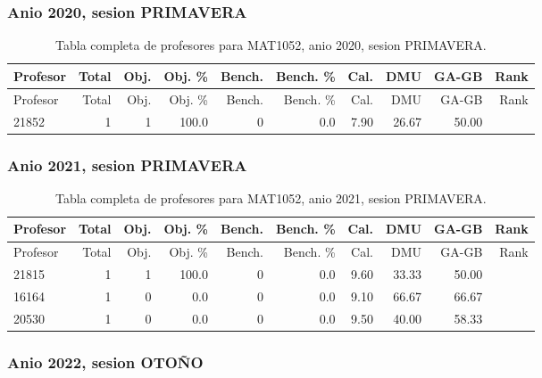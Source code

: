 \subsubsection{Anio 2020, sesion PRIMAVERA}

\begingroup
\scriptsize
\setlength{\tabcolsep}{3pt}
\begin{longtable}{lrrrrrrrrr}
\caption{Tabla completa de profesores para MAT1052, anio 2020, sesion PRIMAVERA.}\label{tab:prof-period-mat1052-2020-primavera}\\
\toprule
Profesor & Total & Obj. & Obj. \% & Bench. & Bench. \% & Cal. & DMU & GA-GB & Rank \\
\midrule
\endfirsthead
\toprule
Profesor & Total & Obj. & Obj. \% & Bench. & Bench. \% & Cal. & DMU & GA-GB & Rank \\
\midrule
\endhead
21852 & 1 & 1 & 100.0 & 0 & 0.0 & 7.90 & 26.67 & 50.00 &  \\
\bottomrule
\end{longtable}
\endgroup

\subsubsection{Anio 2021, sesion PRIMAVERA}

\begingroup
\scriptsize
\setlength{\tabcolsep}{3pt}
\begin{longtable}{lrrrrrrrrr}
\caption{Tabla completa de profesores para MAT1052, anio 2021, sesion PRIMAVERA.}\label{tab:prof-period-mat1052-2021-primavera}\\
\toprule
Profesor & Total & Obj. & Obj. \% & Bench. & Bench. \% & Cal. & DMU & GA-GB & Rank \\
\midrule
\endfirsthead
\toprule
Profesor & Total & Obj. & Obj. \% & Bench. & Bench. \% & Cal. & DMU & GA-GB & Rank \\
\midrule
\endhead
21815 & 1 & 1 & 100.0 & 0 & 0.0 & 9.60 & 33.33 & 50.00 &  \\
16164 & 1 & 0 & 0.0 & 0 & 0.0 & 9.10 & 66.67 & 66.67 &  \\
20530 & 1 & 0 & 0.0 & 0 & 0.0 & 9.50 & 40.00 & 58.33 &  \\
\bottomrule
\end{longtable}
\endgroup

\subsubsection{Anio 2022, sesion OTOÑO}

